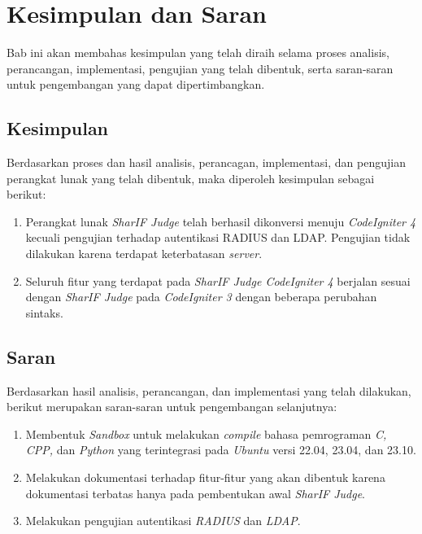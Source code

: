 \chapter{Kesimpulan dan Saran}
\label{chap:kesimpulandansaran}
Bab ini akan membahas kesimpulan yang telah diraih selama proses analisis, perancangan, implementasi, pengujian yang telah dibentuk, serta saran-saran untuk pengembangan yang dapat dipertimbangkan.
\section{Kesimpulan}
Berdasarkan proses dan hasil analisis, perancagan, implementasi, dan pengujian perangkat lunak yang telah dibentuk, maka diperoleh kesimpulan sebagai berikut:
\begin{enumerate}
	\item Perangkat lunak \textit{SharIF Judge} telah berhasil dikonversi menuju \textit{CodeIgniter 4} kecuali pengujian terhadap autentikasi RADIUS dan LDAP. Pengujian tidak dilakukan karena terdapat keterbatasan \textit{server}. 
	\item Seluruh fitur yang terdapat pada \textit{SharIF Judge CodeIgniter 4} berjalan sesuai dengan \textit{SharIF Judge} pada \textit{CodeIgniter 3} dengan beberapa perubahan sintaks.
\end{enumerate}

\section{Saran}
Berdasarkan hasil analisis, perancangan, dan implementasi yang telah dilakukan, berikut merupakan saran-saran untuk pengembangan selanjutnya:
\begin{enumerate}
	\item Membentuk \textit{Sandbox} untuk melakukan \textit{compile} bahasa pemrograman \textit{C, CPP,} dan \textit{Python} yang terintegrasi pada \textit{Ubuntu} versi 22.04, 23.04, dan 23.10.
	\item Melakukan dokumentasi terhadap fitur-fitur yang akan dibentuk karena dokumentasi terbatas hanya pada pembentukan awal \textit{SharIF Judge}.
	\item Melakukan pengujian autentikasi \textit{RADIUS} dan \textit{LDAP}.
\end{enumerate}

